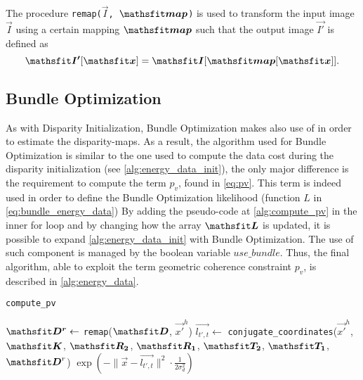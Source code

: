 \begin{FunctionBlock}
The procedure \texttt{remap($\vec I$, $\mat{map}$)} is used to transform the input image $\vec I$ using a certain mapping $\mat{map}$ such that the output image $\vec{I'}$ is defined as  
$$\vec{I'}[\vec x] = \vec I[\mat{map}[\vec x]].$$
\end{FunctionBlock}

\subsection{Bundle Optimization}
As with Disparity Initialization, Bundle Optimization makes also use of \LBP{} in order to estimate the disparity-maps. 
As a result, the algorithm used for Bundle Optimization is similar to the one used to compute the data cost during the disparity initialization (see \cref{alg:energy_data_init}), the only major difference is the requirement to compute the term $p_v$, found in \cref{eq:pv}. This term is indeed used in order to define the Bundle Optimization likelihood (function $L$ in \cref{eq:bundle_energy_data})
By adding the pseudo-code at \cref{alg:compute_pv} in the inner for loop and by changing how the array $\mat L$ is updated, it is possible to expand \cref{alg:energy_data_init} with Bundle Optimization.
The use of such component is managed by the boolean variable $use\_bundle$.
Thus, the final algorithm, able to exploit the term geometric coherence constraint $p_v$, is described in \cref{alg:energy_data}. 
\begin{algorithm}[H]
	\caption{\texttt{compute\_pv}}
	\label{alg:compute_pv}
	\begin{algorithmic}[1]
		\State $\mat{D^r} \leftarrow$ \texttt{remap}($\mat{D}$, $\vec{x'}^h$)
		\State $\vec{l_{t',t}}\leftarrow$ \texttt{conjugate\_coordinates}($\vec {x'}^h$, $\mat K$, $\mat{R_{2}}$, $\mat{R_{1}}$,  $\mat{ T_{2}}$, $\mat{ T_{1}}$, $\mat D^r$)
		\State \Return $\exp\left(-{\lVert \vec x - \vec{l_{t',t}}\rVert^2}\cdot\frac{1}{2\sigma_d^2}\right)$
		\EndProcedure
	\end{algorithmic}
\end{algorithm}
